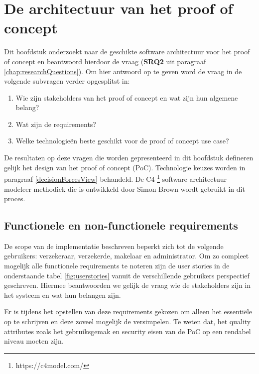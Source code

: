 \chapter{De architectuur van het proof of concept}\label{chap: currentState}
Dit hoofdstuk onderzoekt naar de geschikte software architectuur voor het proof of concept en beantwoord hierdoor de vraag \researchQuestionTwo (\textbf{SRQ2} uit paragraaf \ref{chap:researchQuestions}). Om hier antwoord op te geven word de vraag in de volgende subvragen verder opgesplitst in: 
\begin{enumerate}
	\item Wie zijn stakeholders van het proof of concept en wat zijn hun algemene belang?
	\item Wat zijn de requirements?
	\item Welke technologieën beste geschikt voor de proof of concept use case?
\end{enumerate}

De resultaten op deze vragen die worden gepresenteerd in dit hoofdstuk defineren gelijk het design van het proof of concept (PoC). Technologie keuzes worden in paragraaf \ref{decisionForcesView} behandeld. De C4 \footnote{https://c4model.com/} software architectuur modeleer methodiek die is ontwikkeld door Simon Brown wordt gebruikt in dit proces.

\newpage

\section{Functionele en non-functionele requirements}\label{requirements}
De scope van de implementatie beschreven beperkt zich tot de volgende gebruikers:
verzekeraar, verzekerde, makelaar en administrator. Om zo compleet mogelijk alle functionele requirements te noteren zijn de user stories in de onderstaande tabel \ref{fig:userstories} vanuit de verschillende gebruikers perspectief geschreven. Hiermee beantwoorden we gelijk de vraag wie de stakeholders zijn in het systeem en wat hun belangen zijn.\par

Er is tijdens het opstellen van deze requirements gekozen om alleen het essentiële op te schrijven en deze zoveel mogelijk de versimpelen. Te weten dat, het quality attributes zoals het gebruiksgemak en security eisen van de PoC op een rendabel niveau moeten zijn.

